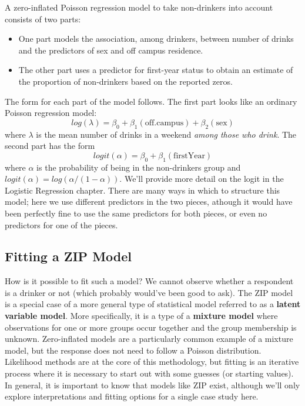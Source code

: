 \documentclass[
]{krantz}
\providecommand{\tightlist}{%
  \setlength{\itemsep}{0pt}\setlength{\parskip}{0pt}}
\begin{document}
A zero-inflated Poisson regression model to take non-drinkers into account consists of two parts:

\begin{itemize}
\tightlist
\item
  One part models the association, among drinkers, between number of drinks and the predictors of sex and off campus residence.
\item
  The other part uses a predictor for first-year status to obtain an estimate of the proportion of non-drinkers based on the reported zeros.
\end{itemize}

The form for each part of the model follows. The first part looks like an ordinary Poisson regression model:
\[
log(\lambda)=\beta_0+\beta_1(\textrm{off.campus})+ \beta_2(\textrm{sex})
\]
where \(\lambda\) is the mean number of drinks in a weekend \emph{among those who drink}.
The second part has the form
\[
logit(\alpha)=\beta_0+\beta_1(\textrm{firstYear})
\]
where \(\alpha\) is the probability of being in the non-drinkers group and \(logit(\alpha) = log( \alpha/(1-\alpha))\). We'll provide more detail on the logit in the Logistic Regression chapter. There are many ways in which to structure this model; here we use different predictors in the two pieces, athough it would have been perfectly fine to use the same predictors for both pieces, or even no predictors for one of the pieces.

\hypertarget{fitting-a-zip-model}{%
\subsection{Fitting a ZIP Model}\label{fitting-a-zip-model}}

How is it possible to fit such a model? We cannot observe whether a respondent is a drinker or not (which probably would've been good to ask). The ZIP model is a special case of a more general type of statistical model referred to as a \textbf{latent variable model}. More specifically, it is a type of a \textbf{mixture model} where observations for one or more groups occur together and the group membership is unknown. Zero-inflated models are a particularly common example of a mixture model, but the response does not need to follow a Poisson distribution. Likelihood methods are at the core of this methodology, but fitting is an iterative process where it is necessary to start out with some guesses (or starting values). In general, it is important to know that models like ZIP exist, although we'll only explore interpretations and fitting options for a single case study here.
\end{document}

